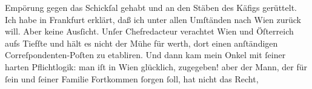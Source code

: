                Empörung gegen das Schickſal gehabt und an den Stäben des Käfigs gerüttelt. Ich habe
               in Frankfurt erklärt, daß ich unter allen
               Umſtänden nach Wien zurück will. Aber keine
               Ausſicht. Unſer Chefredacteur verachtet Wien und Öſterreich aufs Tiefſte und hält es nicht der
               Mühe für werth, dort einen anſtändigen Correſpondenten-Poſten zu etabliren. Und dann
               kam mein Onkel mit{ }ſeiner harten Pflichtlogik:
               man iſt in Wien glücklich, zugegeben! aber der
               Mann, der für{ }ſein und{ }ſeiner Familie Fortkommen{ }ſorgen{ }ſoll, hat nicht das Recht,
